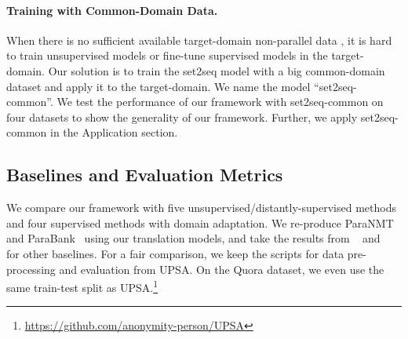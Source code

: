 

\paragraph{Training with Common-Domain Data. } \label{sec:indomain}
When there is no sufficient available target-domain non-parallel data
, it is hard to train unsupervised models or fine-tune supervised models in the target-domain. Our solution is to train the set2seq model with a big common-domain dataset and apply it to the target-domain. We name the model ``set2seq-common''. We test the performance of our framework with set2seq-common on four datasets to show the generality of our framework. Further, we apply set2seq-common in the Application section.

\subsection{Baselines and Evaluation Metrics}
We compare our framework with five unsupervised/distantly-supervised methods 
and four supervised methods with domain adaptation. We re-produce 
ParaNMT~\cite{wieting2017paranmt} and ParaBank~\cite{hu2019parabank} using 
our translation models, and take the results from \citeauthor{liu2019unsupervised}~ 
and \citeauthor{liu2020exploring}~ for other baselines. 
For a fair comparison, we keep the scripts for data pre-processing and 
evaluation from UPSA. On the Quora dataset, we even use the same train-test 
split as UPSA.\footnote{ \url{https://github.com/anonymity-person/UPSA}}

